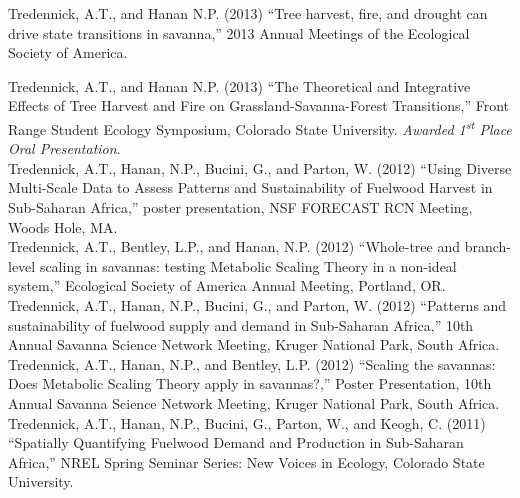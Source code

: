 \documentclass[margin,line]{resume}
\begin{document}
\begin{resume}
    Tredennick, A.T., and Hanan N.P. (2013) ``Tree harvest, fire, and drought can drive state transitions in savanna,'' 2013 Annual Meetings of the Ecological Society of America. \vspace{-6mm}\\%
            \newpage{}    
    
    Tredennick, A.T., and Hanan N.P. (2013) ``The Theoretical and Integrative Effects of Tree Harvest and Fire on Grassland-Savanna-Forest Transitions,'' Front Range Student Ecology Symposium, Colorado State University. \textsl{Awarded 1\textsuperscript{st} Place Oral Presentation}. \vspace{-6mm}\\%
    
    Tredennick, A.T., Hanan, N.P., Bucini, G., and Parton, W. (2012) ``Using Diverse Multi-Scale Data to Assess Patterns and Sustainability of Fuelwood Harvest in Sub-Saharan Africa,'' poster presentation, NSF FORECAST RCN Meeting, Woods Hole, MA. \vspace{-6mm}\\%
    
    Tredennick, A.T., Bentley, L.P., and Hanan, N.P. (2012) ``Whole-tree and branch-level scaling in savannas: testing Metabolic Scaling Theory in a non-ideal system,'' Ecological Society of America Annual Meeting, Portland, OR. \vspace{-6mm}\\%
    
    Tredennick, A.T., Hanan, N.P., Bucini, G., and Parton, W. (2012) ``Patterns and sustainability of fuelwood supply and demand in Sub-Saharan Africa,'' 10th Annual Savanna Science Network Meeting, Kruger National Park, South Africa.\vspace{-6mm}\\%
    
    Tredennick, A.T., Hanan, N.P., and Bentley, L.P. (2012) ``Scaling the savannas: Does Metabolic Scaling Theory apply in savannas?,'' Poster Presentation, 10th Annual Savanna Science Network Meeting, Kruger National Park, South Africa. \vspace{-6mm}\\%

    Tredennick, A.T., Hanan, N.P., Bucini, G., Parton, W., and Keogh, C. (2011) ``Spatially Quantifying Fuelwood Demand and Production in Sub-Saharan Africa,'' NREL Spring Seminar Series: New Voices in Ecology, Colorado State University.\vspace{-6mm}\\%
    

\end{resume}
\end{document}

